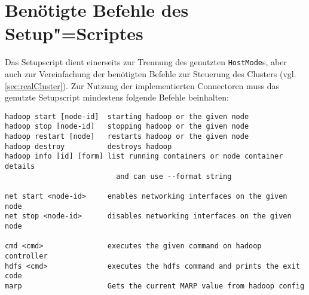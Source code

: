 \chapter{Benötigte Befehle des Setup"=Scriptes}
\label{app:setupScriptCmds}

Das Setupscript dient einerseits zur Trennung des genutzten \texttt{HostMode}s, aber auch zur Vereinfachung der benötigten Befehle zur Steuerung des Clusters (vgl. \cref{sec:realCluster}).
Zur Nutzung der implementierten Connectoren muss das genutzte Setupscript mindestens folgende Befehle beinhalten:

\begin{lstlisting}[label=lst:setupscriptHelp,style=plain,
caption={[Benötigte Befehle eines Setupscriptes]
Benötigte Befehle eines Setupscriptes.
Das Setupscript für den \texttt{Multihost}"=Mode bietet zum Teil andere Befehle an, besitzt jedoch entsprechende Befehle zur vollständigen Kompatibilität.}]
hadoop start [node-id]  starting hadoop or the given node
hadoop stop [node-id]   stopping hadoop or the given node
hadoop restart [node]   restarts hadoop or the given node
hadoop destroy          destroys hadoop
hadoop info [id] [form] list running containers or node container details
                          and can use --format string

net start <node-id>     enables networking interfaces on the given node
net stop <node-id>      disables networking interfaces on the given node

cmd <cmd>               executes the given command on hadoop controller
hdfs <cmd>              executes the hdfs command and prints the exit code
marp                    Gets the current MARP value from hadoop config
\end{lstlisting}


